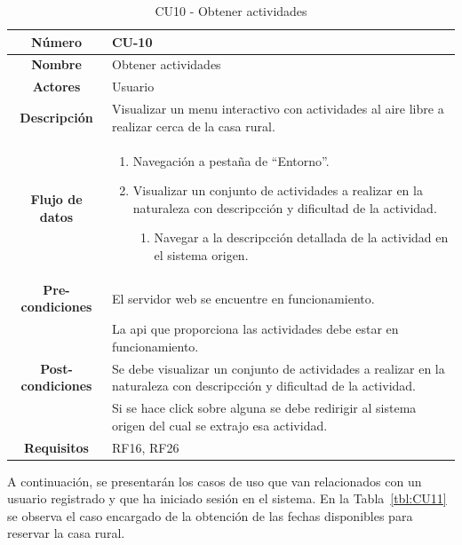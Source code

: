 \begin{table}[h!tb]
	\centering
	\begin{adjustbox}{width=1\textwidth}
	\begin{tabular}{|c|p{\textwidth}|}
		\hline {\bf Número} & CU-10 \\
		\hline {\bf Nombre} & Obtener actividades\\
		\hline {\bf Actores} & Usuario \\
		\hline {\bf Descripción} & Visualizar un menu interactivo con actividades al aire libre a realizar cerca de la casa rural. \\
		\hline {\bf Flujo de datos}
		& 
		\begin{enumerate}
			\item Navegación a pestaña de ``Entorno''.
            \item Visualizar un conjunto de actividades a realizar en la naturaleza con descripcción y dificultad de la actividad.
            \begin{enumerate}
                \item Navegar a la descripcción detallada de la actividad en el sistema origen.
            \end{enumerate}
        \end{enumerate}\\
		\hline {\bf Pre-condiciones}
		& El servidor web se encuentre en funcionamiento. \\
        & La api que proporciona las actividades debe estar en funcionamiento. \\
		\hline {\bf Post-condiciones}
		& Se debe visualizar un conjunto de actividades a realizar en la naturaleza con descripcción y dificultad de la actividad. \\
        & Si se hace click sobre alguna se debe redirigir al sistema origen del cual se extrajo esa actividad. \\
    
		\hline {\bf Requisitos} & RF16, RF26 \\
		\hline 
	\end{tabular}
	\end{adjustbox}
	\caption{CU10 - Obtener actividades\label{tbl:CU10}}
\end{table}
A continuación, se presentarán los casos de uso que van relacionados con un usuario registrado y que ha iniciado sesión en el sistema. En la Tabla~\ref{tbl:CU11} se observa el caso encargado de la obtención de las fechas disponibles para reservar la casa rural.
